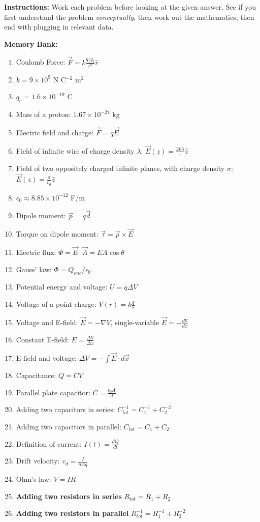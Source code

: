 \documentclass[10pt]{article}
\begin{document}
\maketitle

\textbf{Instructions:} Work each problem before looking at the given answer.  See if you first understand the problem \textit{conceptually}, then work out the mathematics, then end with plugging in relevant data. \\ \vspace{0.25cm}

\textbf{Memory Bank:}
\begin{enumerate}
\item Coulomb Force: $\vec{F} = k \frac{q_1 q_2}{r^2}\hat{r}$
\item $k = 9 \times 10^{9}$ N C$^{-2}$ m$^{2}$
\item $q_e = 1.6 \times 10^{-19}$ C
\item Mass of a proton: $1.67 \times 10^{-27}$ kg
\item Electric field and charge: $\vec{F} = q \vec{E}$
\item Field of infinite wire of charge density $\lambda$: $\vec{E}(z) = \frac{2k\lambda}{z}\hat{z}$
\item Field of two oppositely charged infinite planes, with charge density $\sigma$: $\vec{E}(z) = \frac{\sigma}{\epsilon_0}\hat{z}$
\item $\epsilon_0 \approx 8.85 \times 10^{-12}$ F/m
\item Dipole moment: $\vec{p} = q \vec{d}$
\item Torque on dipole moment: $\vec{\tau} = \vec{p} \times \vec{E}$
\item Electric flux: $\Phi = \vec{E} \cdot \vec{A} = EA \cos\theta$
\item Gauss' law: $\Phi = Q_{enc}/\epsilon_0$
\item Potential energy and voltage: $U = q\Delta V$
\item Voltage of a point charge: $V(r) = k\frac{q}{r}$
\item Voltage and E-field: $\vec{E} = -\nabla V$, single-variable $\vec{E} = -\frac{dV}{dx}$
\item Constant E-field: $E = \frac{\Delta V}{\Delta x}$
\item E-field and voltage: $\Delta V = -\int \vec{E} \cdot d\vec{x}$
\item Capacitance: $Q = CV$
\item Parallel plate capacitor: $C = \frac{\epsilon_0 A}{d}$
\item Adding two capacitors in series: $C_{tot}^{-1} = C_1^{-1} + C_2^{-2}$
\item Adding two capacitors in parallel: $C_{tot} = C_1 + C_2$
\item Definition of current: $I(t) = \frac{dQ}{dt}$
\item Drift velocity: $v_d = \frac{I}{nAq}$
\item Ohm's law: $V = IR$
\item \textbf{Adding two resistors in series} $R_{tot} = R_1 + R_2$
\item \textbf{Adding two resistors in parallel} $R_{tot}^{-1} = R_1^{-1} + R_2^{-2}$
\end{enumerate}
\end{document}
